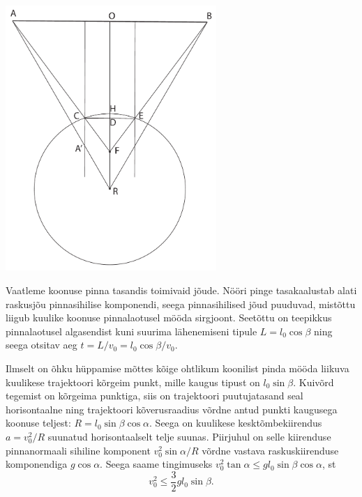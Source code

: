 \documentclass[10pt]{article}
\begin{document}
\vspace{-20pt}
\begin{center}
  \includegraphics[width=0.6\textwidth]{2019-v3g-10-yl.pdf}
\end{center}
\vspace{-20pt}
\probend
\bigskip


\solu
\osa Vaatleme koonuse pinna tasandis toimivaid jõude. Nööri pinge tasakaalustab alati raskusjõu pinnasihilise komponendi, seega pinnasihilised jõud puuduvad, mistõttu liigub kuulike koonuse pinnalaotusel mööda sirgjoont. Seetõttu on teepikkus pinnalaotusel algasendist kuni suurima lähenemiseni tipule $L=l_0\cos\beta$ ning seega otsitav aeg $t=L/v_0=l_0\cos\beta/v_0$. 

\osa Ilmselt on õhku hüppamise mõttes kõige ohtlikum koonilist pinda mööda liikuva kuulikese trajektoori kõrgeim punkt, mille kaugus tipust on $l_0\sin\beta$. Kuivõrd tegemist on kõrgeima punktiga, siis on trajektoori puutujatasand seal horisontaalne ning trajektoori kõverusraadius võrdne antud punkti kaugusega koonuse teljest: $R=l_0\sin\beta\cos\alpha$. Seega on kuulikese kesktõmbekiirendus $a=v_0^2/R$ suunatud horisontaalselt telje suunas. Piirjuhul on selle kiirenduse pinnanormaali sihiline komponent $v_0^2\sin\alpha/R$ võrdne vastava raskuskiirenduse komponendiga $g\cos\alpha$. Seega saame tingimuseks $v_0^2\tan\alpha\le gl_0\sin\beta\cos\alpha$, st $$v_0^2\le \frac{3}{2}gl_0\sin\beta.$$
\probend
\bigskip
\end{document}
